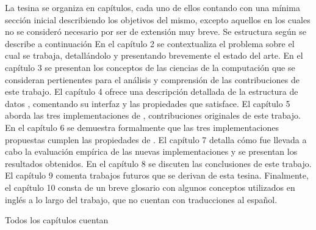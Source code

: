   La tesina se organiza en capítulos, cada uno de ellos contando con una mínima sección inicial
  describiendo los objetivos del mismo, excepto aquellos en los cuales no se consideró necesario por
  ser de extensión muy breve.
  Se estructura según se describe a continuación
  En el capítulo 2 se
  contextualiza el problema sobre el cual se trabaja, detallándolo y presentando brevemente
  el estado del arte.
  En el capítulo 3 se presentan los conceptos de las ciencias de la computación que se
  consideran pertienentes para el análisis y comprensión de las contribuciones de este trabajo.
  El capítulo 4 ofrece una descripción detallada de la estructura de datos \setchain,
  comentando su interfaz y las propiedades que satisface.
  El capítulo 5 aborda las tres implementaciones de \setchain, contribuciones originales
  de este trabajo.
  En el capítulo 6 se demuestra formalmente que las tres implementaciones propuestas
  cumplen las propiedades de \setchain.
  El capítulo 7 detalla cómo fue llevada a cabo la evaluación empírica de las nuevas implementaciones
  y se presentan los resultados obtenidos.
  En el capítulo 8 se discuten las conclusiones de este trabajo.
  El capítulo 9 comenta trabajos futuros que se derivan de esta tesina.
  Finalmente, el capítulo 10 consta de un breve glosario con algunos conceptos
  utilizados en inglés a lo largo del trabajo, que no cuentan con traducciones al español.

  Todos los capítulos cuentan 

